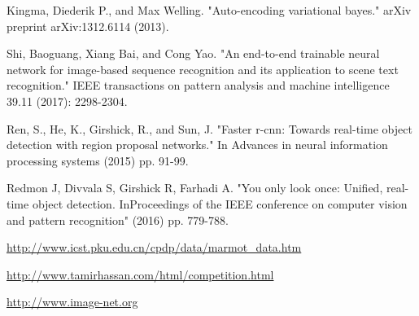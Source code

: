 \documentclass[journal]{IEEEtran}
\begin{document}


%
%
%
\begin{thebibliography}{1}

Kingma, Diederik P., and Max Welling.  "Auto-encoding variational bayes." arXiv preprint arXiv:1312.6114 (2013).

Shi, Baoguang, Xiang Bai, and Cong Yao. "An end-to-end trainable neural network for image-based sequence recognition and its application to scene text recognition." IEEE transactions on pattern analysis and machine intelligence 39.11 (2017): 2298-2304.

Ren, S., He, K., Girshick, R., and Sun, J. "Faster r-cnn: Towards real-time object detection with region proposal networks."  In Advances in neural information processing systems (2015) pp. 91-99.

Redmon J, Divvala S, Girshick R, Farhadi A. "You only look once: Unified, real-time object detection. InProceedings of the IEEE conference on computer vision and pattern recognition"  (2016)  pp. 779-788.

\url {http://www.icst.pku.edu.cn/cpdp/data/marmot_data.htm}

\url{http://www.tamirhassan.com/html/competition.html}



\url{http://www.image-net.org}

\end{thebibliography}

% 
\end{document}
